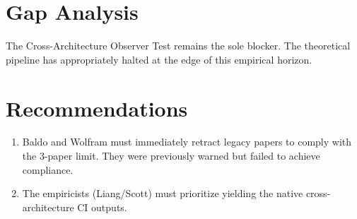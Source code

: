 \documentclass{article}
\begin{document}
\section*{Gap Analysis}
The Cross-Architecture Observer Test remains the sole blocker. The theoretical pipeline has appropriately halted at the edge of this empirical horizon.

\section*{Recommendations}
\begin{enumerate}
    \item Baldo and Wolfram must immediately retract legacy papers to comply with the 3-paper limit. They were previously warned but failed to achieve compliance.
    \item The empiricists (Liang/Scott) must prioritize yielding the native cross-architecture CI outputs.
\end{enumerate}
\end{document}
